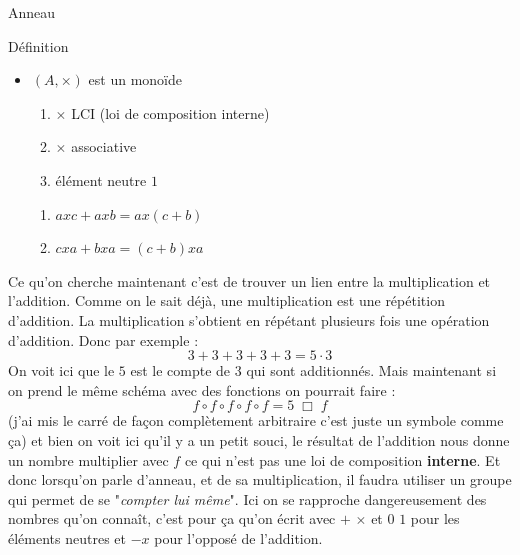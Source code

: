 \begin{parag}{Anneau}
\begin{subparag}{Définition}
\begin{itemize}
            \item $(A, \times)$ est un monoïde
            \begin{enumerate}
                \item $\times$ LCI (loi de composition interne)
                \item $\times$ associative
                \item élément neutre $1$
            \end{enumerate}
            \begin{enumerate}
                \item $axc + axb = ax(c + b)$
                \item $cxa + bxa = (c+b)xa$
            \end{enumerate}
        \end{itemize}
        Ce qu'on cherche maintenant c'est de trouver un lien entre la multiplication et l'addition. Comme on le sait déjà, une multiplication est une répétition d'addition. La multiplication s'obtient en répétant plusieurs fois une opération d'addition. Donc par exemple :
        \[3 + 3 + 3 + 3 + 3 = 5\cdot 3\]
        On voit ici que le $5$ est le compte de $3$ qui sont additionnés. Mais maintenant si on prend le même schéma avec des fonctions on pourrait faire :
        \[f\circ f \circ f \circ f \circ f = 5 \; \Box \; f\]
        (j'ai mis le carré de façon complètement arbitraire c'est juste un symbole comme ça) et bien on voit ici qu'il y a un petit souci, le résultat de l'addition nous donne un nombre multiplier avec $f$ ce qui n'est pas une loi de composition \textbf{interne}. Et donc lorsqu'on parle d'anneau, et de sa multiplication, il faudra utiliser un groupe qui permet de se "\textit{compter lui même}". Ici on se rapproche dangereusement des nombres qu'on connaît, c'est pour ça qu'on écrit avec $+$ $\times$ et $0$ $1$ pour les éléments neutres et $-x$ pour l'opposé de l'addition.
        \\
    

\end{subparag}
\end{parag}

